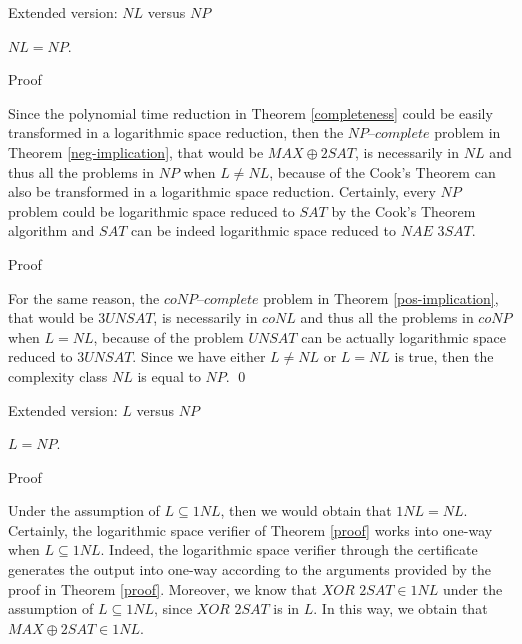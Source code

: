 \documentclass[11pt]{beamer}
\begin{document}
\begin{frame}{Extended version: $NL$ versus $NP$}

\begin{theorem}
\label{nl}
$NL = NP$.
\end{theorem}

\end{frame}

\begin{frame}{Proof}

Since the polynomial time reduction in Theorem \ref{completeness} could be easily transformed in a logarithmic space reduction, then the $\textit{NP--complete}$ problem in Theorem \ref{neg-implication}, that would be $MAX\oplus2SAT$, is necessarily in $NL$ and thus all the problems in $NP$ when $L \neq NL$, because of the Cook's Theorem can also be transformed in a logarithmic space reduction. Certainly, every $NP$ problem could be logarithmic space reduced to $SAT$ by the Cook's Theorem algorithm and $SAT$ can be indeed logarithmic space reduced to $\textit{NAE 3SAT}$.

\end{frame}

\begin{frame}{Proof}

For the same reason, the $\textit{coNP--complete}$ problem in Theorem \ref{pos-implication}, that would be $3UNSAT$, is necessarily in $coNL$ and thus all the problems in $coNP$ when $L = NL$, because of the problem $UNSAT$ can be actually logarithmic space reduced to $3UNSAT$. Since we have either $L \neq NL$ or $L = NL$ is true, then the complexity class $NL$ is equal to $NP$. \qed

\end{frame}

\begin{frame}{Extended version: $L$ versus $NP$}

\begin{theorem}
$L = NP$.
\end{theorem}

\end{frame}

\begin{frame}{Proof}

Under the assumption of $L \subseteq 1NL$, then we would obtain that $1NL = NL$. Certainly, the logarithmic space verifier of Theorem \ref{proof} works into one-way when $L \subseteq 1NL$. Indeed, the logarithmic space verifier through the certificate generates the output into one-way according to the arguments provided by the proof in Theorem \ref{proof}. Moreover, we know that $\textit{XOR 2SAT} \in 1NL$ under the assumption of $L \subseteq 1NL$, since $\textit{XOR 2SAT}$ is in $L$. In this way, we obtain that $MAX\oplus2SAT \in 1NL$. 
\end{frame}
\end{document}
